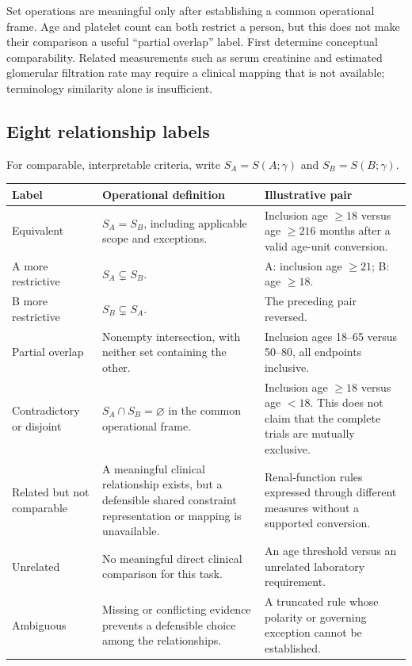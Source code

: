 \documentclass[10pt,letterpaper]{article}
\begin{document}
Set operations are meaningful only after establishing a common operational
frame. Age and platelet count can both restrict a person, but this does not
make their comparison a useful ``partial overlap'' label. First determine
conceptual comparability. Related measurements such as serum creatinine and
estimated glomerular filtration rate may require a clinical mapping that is
not available; terminology similarity alone is insufficient.

\subsection{Eight relationship labels}
For comparable, interpretable criteria, write $S_A=S(A;\gamma)$ and
$S_B=S(B;\gamma)$.
\begin{longtable}{L{.23\linewidth}L{.39\linewidth}L{.29\linewidth}}
\toprule Label & Operational definition & Illustrative pair\\\midrule
\endhead
Equivalent & $S_A=S_B$, including applicable scope and exceptions. & Inclusion age $\geq18$ versus age $\geq216$ months after a valid age-unit conversion.\\
A more restrictive & $S_A\subsetneq S_B$. & A: inclusion age $\geq21$; B: age $\geq18$.\\
B more restrictive & $S_B\subsetneq S_A$. & The preceding pair reversed.\\
Partial overlap & Nonempty intersection, with neither set containing the other. & Inclusion ages 18--65 versus 50--80, all endpoints inclusive.\\
Contradictory or disjoint & $S_A\cap S_B=\varnothing$ in the common operational frame. & Inclusion age $\geq18$ versus age $<18$. This does not claim that the complete trials are mutually exclusive.\\
Related but not comparable & A meaningful clinical relationship exists, but a defensible shared constraint representation or mapping is unavailable. & Renal-function rules expressed through different measures without a supported conversion.\\
Unrelated & No meaningful direct clinical comparison for this task. & An age threshold versus an unrelated laboratory requirement.\\
Ambiguous & Missing or conflicting evidence prevents a defensible choice among the relationships. & A truncated rule whose polarity or governing exception cannot be established.\\\bottomrule
\end{longtable}
\end{document}
